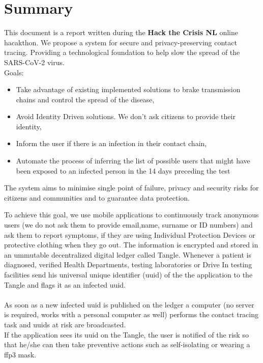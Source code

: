 {\color{PineGreen}\section{Summary}}

This document is a report written during the \textbf{Hack the Crisis NL} online hacakthon\cite{bib1}. We propose a system for secure and privacy-preserving contact tracing. Providing a technological foundation to help slow the spread of the SARS-CoV-2 virus.\\

Goals:
\begin{itemize}
\item Take advantage of existing implemented solutions to brake transmission chains and control the spread of the disease,
\item Avoid Identity Driven solutions. We don't ask citizens to provide their identity,
\item Inform the user if there is an infection in their contact chain,
\item Automate the process of inferring the list of possible users that might have been exposed to an infected person in the 14 days preceding the test
\end{itemize} 

The system aims to minimise single point of failure, privacy and security risks for citizens and communities and to guarantee data protection.

To achieve this goal, we use mobile applications to continuously track anonymous users (we do not ask them to provide email,name, surname or ID numbers) and ask them to report symptoms, if they are using Individual Protection Devices or protective clothing when they go out. The information is encrypted and stored in an ummutable decentralized digital ledger called Tangle. 
Whenever a patient is diagnosed, verified Health Departments, testing laboratories or Drive In testing facilities send his universal unique identifier (uuid) of the the application to the Tangle and flags it as an infected uuid. \\
\\
As soon as a new infected uuid is published on the ledger a computer (no server is required, works with a personal computer as well) performs the contact tracing task and uuids at risk are broadcasted.\\
If the application sees its uuid on the Tangle, the user is notified of the risk so that he/she can then take preventive actions such as self-isolating or wearing a ffp3 mask.

